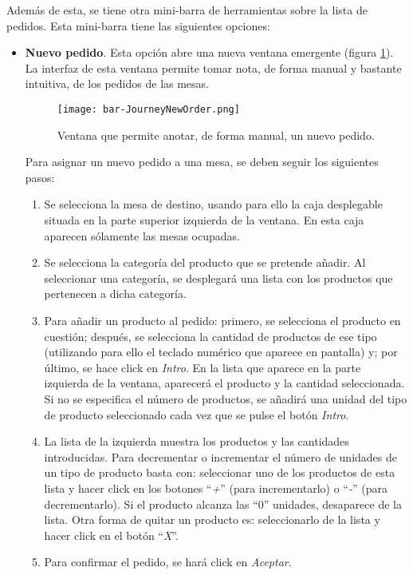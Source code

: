 \begin{itemize}
Además de esta, se tiene otra mini-barra de herramientas sobre la lista de
pedidos. Esta mini-barra tiene las siguientes opciones:
\begin{itemize}
\item \textbf{Nuevo pedido}. Esta opción abre una nueva ventana emergente
(figura \ref{fig:bar-JourneyNewOrder}). La interfaz de esta ventana permite 
tomar nota, de forma manual y bastante intuitiva, de los pedidos de las mesas.

  \begin{figure}[H]
    \begin{center}
      \texttt{[image: bar-JourneyNewOrder.png]}
      \caption{Ventana que permite anotar, de forma manual, un nuevo pedido.}
      \label{fig:bar-JourneyNewOrder}
    \end{center}
  \end{figure}

Para asignar un nuevo pedido a una mesa, se deben seguir los siguientes pasos:
\begin{enumerate}
\item Se selecciona la mesa de destino, usando para ello la caja desplegable
situada en la parte superior izquierda de la ventana. En esta caja aparecen
sólamente las mesas ocupadas.
\item Se selecciona la categoría del producto que se pretende añadir. Al
seleccionar una categoría, se desplegará una lista con los productos que
pertenecen a dicha categoría.
\item Para añadir un producto al pedido: primero, se selecciona el producto
en cuestión; después, se selecciona la cantidad de productos de ese tipo
(utilizando para ello el teclado numérico que aparece en pantalla) y; por
último, se hace click en \emph{Intro}. En la lista que aparece en la parte
izquierda de la ventana, aparecerá el producto y la cantidad seleccionada.
Si no se especifica el número de productos, se añadirá una unidad del tipo
de producto seleccionado cada vez que se pulse el botón \emph{Intro}.
\item La lista de la izquierda muestra los productos y las cantidades
introducidas. Para decrementar o incrementar el número de unidades de un tipo
de producto basta con: seleccionar uno de los productos de esta lista y
hacer click en los botones ``\emph{+}'' (para incrementarlo) o ``\emph{-}''
(para decrementarlo). Si el producto alcanza las ``0'' unidades, desaparece de 
la lista. Otra forma de quitar un producto es: seleccionarlo de la lista y
hacer click en el botón ``\emph{X}''.
\item Para confirmar el pedido, se hará click en \emph{Aceptar}.
\end{enumerate}


\end{itemize}
\end{itemize}
